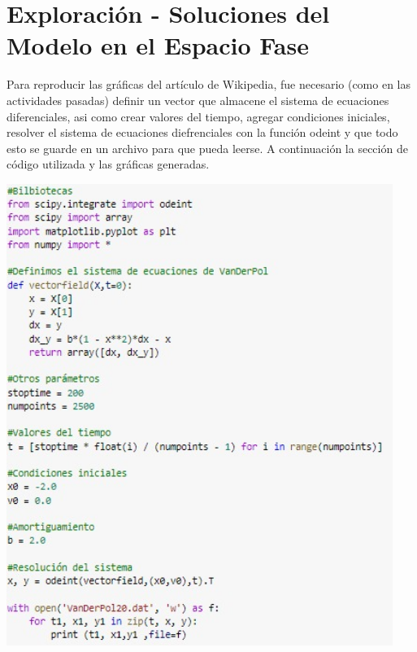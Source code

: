 \documentclass[12pt]{article}
\begin{document}
\section*{Exploración - Soluciones del Modelo en el Espacio Fase}
Para reproducir las gráficas del artículo de Wikipedia, fue necesario (como en las actividades pasadas) definir un vector que almacene el sistema de ecuaciones diferenciales, asi como crear valores del tiempo, agregar condiciones iniciales, resolver el sistema de ecuaciones diefrenciales con la función odeint y que todo esto se guarde en un archivo para que pueda leerse. A continuación la sección de código utilizada y las gráficas generadas.
\begin{center}
    \includegraphics[height=15cm]{O1.jpeg}\\
\end{center}
\end{document}
